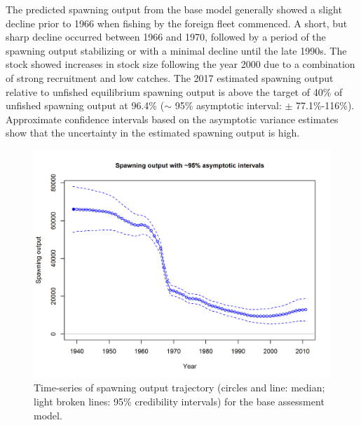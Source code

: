 \documentclass[12pt,]{article}
\begin{document}
The predicted spawning output from the base model generally showed a
slight decline prior to 1966 when fishing by the foreign fleet
commenced. A short, but sharp decline occurred between 1966 and 1970,
followed by a period of the spawning output stabilizing or with a
minimal decline until the late 1990s. The stock showed increases in
stock size following the year 2000 due to a combination of strong
recruitment and low catches. The 2017 estimated spawning output relative
to unfished equilibrium spawning output is above the target of 40\% of
unfished spawning output at 96.4\% (\(\sim\) 95\% asymptotic interval:
\(\pm\) 77.1\%-116\%). Approximate confidence intervals based on the
asymptotic variance estimates show that the uncertainty in the estimated
spawning output is high.

\begin{figure}
\centering
\includegraphics{r4ss/plots_mod1/ts7_Spawning_output_with_95_asymptotic_intervals_intervals.png}
\caption{Time-series of spawning output trajectory (circles and line:
median; light broken lines: 95\% credibility intervals) for the base
assessment model. \label{fig:Spawnbio_all}}
\end{figure}
\end{document}

